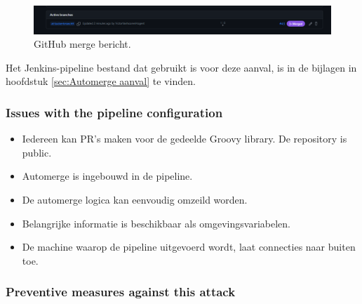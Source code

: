 \begin{figure}[H]
  \includegraphics[scale=0.52]{graphics/mergedGitHub.png}
\caption{\label{fig:mergit} GitHub merge bericht.}
\end{figure}

Het Jenkins-pipeline bestand dat gebruikt is voor deze aanval, is in de bijlagen in hoofdstuk \ref{sec:Automerge aanval} te vinden.

\subsubsection{
{Issues with the pipeline configuration}}
\label{sec:Problemen met de pipeline configuratie}

\begin{itemize}  
  \item Iedereen kan PR's maken voor de gedeelde Groovy library. De repository is public.
  \item Automerge is ingebouwd in de pipeline.
  \item De automerge logica kan eenvoudig omzeild worden.
  \item Belangrijke informatie is beschikbaar als omgevingsvariabelen.
  \item De machine waarop de pipeline uitgevoerd wordt, laat connecties naar buiten toe.
\end{itemize}

\subsubsection{
{Preventive measures against this attack}}
\label{sec:Hoe deze aanval te voorkomen}

